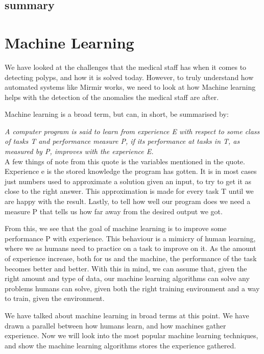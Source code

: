 \subsection{summary}
    

\section{Machine Learning}
We have looked at the challenges that the medical staff has when it comes to detecting polyps, and how it is solved today.
However, to truly understand how automated systems like Mirmir works, we need to look at how Machine learning helps with the detection of the anomalies the medical staff are after.  

Machine learning is a broad term, but can, in short, be summarised by:\\
\vspace{10px}

\textit{ A computer program is said to learn from experience E with respect to some class of tasks T and performance measure P, if its performance at tasks in T, as measured by P, improves with the experience E. } \cite{MitchellTomM1997Ml}\\

\vspace{10px}
A few things of note from this quote is the variables mentioned in the quote. Experience e is the stored knowledge the program has gotten. It is in most cases just numbers used to approximate a solution given an input, to try to get it as close to the right answer. This approximation is made for every task T until we are happy with the result.
Lastly, to tell how well our program does we need a measure P that tells us how far away from the desired output we got.
   
From this, we see that the goal of machine learning is to improve some performance P with experience. This behaviour is a mimicry of human learning, where we as humans need to practice on a task to improve on it.
As the amount of experience increase, both for us and the machine, the performance of the task becomes better and better. With this in mind, we can assume that, given the right amount and type of data, our machine learning algorithms can solve any problems humans can solve, given both the right training environment and a way to train, given the environment.

We have talked about machine learning in broad terms at this point. We have drawn a parallel between how humans learn, and how machines gather experience.  Now we will look into the most popular machine learning techniques, and show the machine learning algorithms stores the experience gathered.
 
